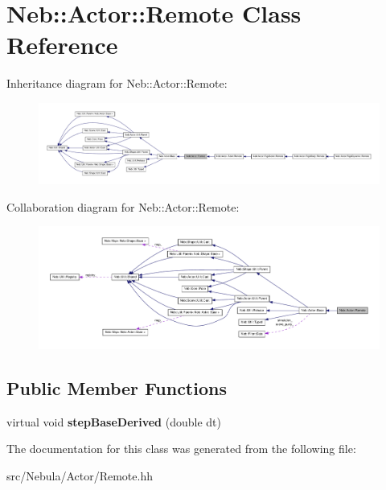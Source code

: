 \hypertarget{classNeb_1_1Actor_1_1Remote}{\section{\-Neb\-:\-:\-Actor\-:\-:\-Remote \-Class \-Reference}
\label{classNeb_1_1Actor_1_1Remote}
}


\-Inheritance diagram for \-Neb\-:\-:\-Actor\-:\-:\-Remote\-:\nopagebreak
\begin{figure}[H]
\begin{center}
\leavevmode
\includegraphics[width=350pt]{classNeb_1_1Actor_1_1Remote__inherit__graph}
\end{center}
\end{figure}


\-Collaboration diagram for \-Neb\-:\-:\-Actor\-:\-:\-Remote\-:\nopagebreak
\begin{figure}[H]
\begin{center}
\leavevmode
\includegraphics[width=350pt]{classNeb_1_1Actor_1_1Remote__coll__graph}
\end{center}
\end{figure}
\subsection*{\-Public \-Member \-Functions}
\begin{DoxyCompactItemize}
\item 
\hypertarget{classNeb_1_1Actor_1_1Remote_a977aac1a64834963ed67310a5a639945}{virtual void {\bfseries step\-Base\-Derived} (double dt)}\label{classNeb_1_1Actor_1_1Remote_a977aac1a64834963ed67310a5a639945}

\end{DoxyCompactItemize}


\-The documentation for this class was generated from the following file\-:\begin{DoxyCompactItemize}
\item 
src/\-Nebula/\-Actor/\-Remote.\-hh\end{DoxyCompactItemize}
